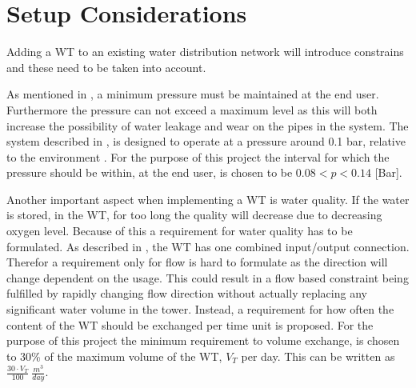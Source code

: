 

\section{Setup Considerations}



Adding a WT to an existing water distribution network will introduce constrains and these need to be taken into account. 

As mentioned in , a minimum pressure must be maintained at the end user. Furthermore the pressure can not exceed a maximum level as this will both increase the possibility of water leakage and wear on the pipes in the system. The system described in , is designed to operate at a pressure around 0.1 bar, relative to the environment \cite{master_aau}. For the purpose of this project the interval for which the pressure should be within, at the end user, is chosen to be $0.08 < p < 0.14$ [Bar].

Another important aspect when implementing a WT is water quality. If the water is stored, in the WT, for too long the quality will decrease due to decreasing oxygen level. Because of this a requirement for water quality has to be formulated. As described in , the WT has one combined input/output connection. Therefor a requirement only for flow is hard to formulate as the direction will change dependent on the usage. This could result in a flow based constraint being fulfilled by rapidly changing flow direction without actually replacing any significant water volume in the tower. Instead, a requirement for how often the content of the WT should be exchanged per time unit is proposed. For the purpose of this project the minimum requirement to volume exchange, is chosen to 30\% of the maximum volume of the WT, $V_T$ per day. This can be written as $\frac{30\cdot V_T}{100} \: \frac{m^3}{day}$.










 
 